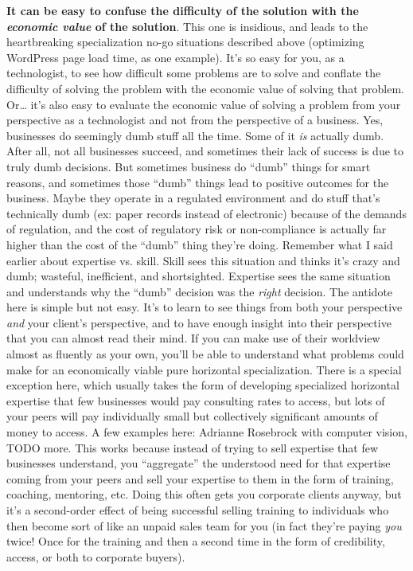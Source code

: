 \textbf{It can be easy to confuse the difficulty of the solution with the \emph{economic value} of the solution}. This one is insidious, and leads to the heartbreaking specialization no-go situations described above (optimizing WordPress page load time, as one example). It's so easy for you, as a technologist, to see how difficult some problems are to solve and conflate the difficulty of solving the problem with the economic value of solving that problem. Or\ldots{} it's also easy to evaluate the economic value of solving a problem from your perspective as a technologist and not from the perspective of a business. Yes, businesses do seemingly dumb stuff all the time. Some of it \emph{is} actually dumb. After all, not all businesses succeed, and sometimes their lack of success is due to truly dumb decisions. But sometimes business do ``dumb'' things for smart reasons, and sometimes those ``dumb'' things lead to positive outcomes for the business. Maybe they operate in a regulated environment and do stuff that's technically dumb (ex: paper records instead of electronic) because of the demands of regulation, and the cost of regulatory risk or non-compliance is actually far higher than the cost of the ``dumb'' thing they're doing. Remember what I said earlier about expertise vs. skill. Skill sees this situation and thinks it's crazy and dumb; wasteful, inefficient, and shortsighted. Expertise sees the same situation and understands why the ``dumb'' decision was the \emph{right} decision. The antidote here is simple but not easy. It's to learn to see things from both your perspective \emph{and} your client's perspective, and to have enough insight into their perspective that you can almost read their mind. If you can make use of their worldview almost as fluently as your own, you'll be able to understand what problems could make for an economically viable pure horizontal specialization. There is a special exception here, which usually takes the form of developing specialized horizontal expertise that few businesses would pay consulting rates to access, but lots of your peers will pay individually small but collectively significant amounts of money to access. A few examples here: Adrianne Rosebrock with computer vision, TODO more. This works because instead of trying to sell expertise that few businesses understand, you ``aggregate'' the understood need for that expertise coming from your peers and sell your expertise to them in the form of training, coaching, mentoring, etc. Doing this often gets you corporate clients anyway, but it's a second-order effect of being successful selling training to individuals who then become sort of like an unpaid sales team for you (in fact they're paying \emph{you} twice! Once for the training and then a second time in the form of credibility, access, or both to corporate buyers).

